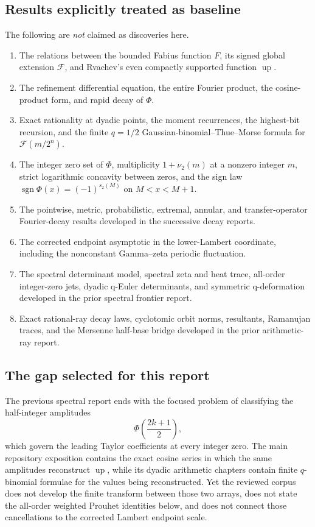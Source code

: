 \documentclass[11pt,oneside]{article}
\theoremstyle{definition}
\theoremstyle{remark}
\newcommand{\Up}{\operatorname{up}}
\newcommand{\GF}{\mathcal F}
\newcommand{\PhiU}{\Phi}
\begin{document}
\subsection{Results explicitly treated as baseline}

The following are \emph{not} claimed as discoveries here.
\begin{enumerate}
 \item The relations between the bounded Fabius function $F$, its signed global
 extension $\GF$, and Rvachev's even compactly supported function $\Up$.
 \item The refinement differential equation, the entire Fourier product, the
 cosine-product form, and rapid decay of $\PhiU$.
 \item Exact rationality at dyadic points, the moment recurrences, the
 highest-bit recursion, and the finite $q=1/2$ Gaussian-binomial--Thue--Morse
 formula for $\GF(m/2^n)$.
 \item The integer zero set of $\PhiU$, multiplicity $1+\nu_2(m)$ at a nonzero
 integer $m$, strict logarithmic concavity between zeros, and the sign law
 $\operatorname{sgn}\PhiU(x)=(-1)^{s_2(M)}$ on $M<x<M+1$.
 \item The pointwise, metric, probabilistic, extremal, annular, and transfer-operator
 Fourier-decay results developed in the successive decay reports.
 \item The corrected endpoint asymptotic in the lower-Lambert coordinate,
 including the nonconstant Gamma--zeta periodic fluctuation.
 \item The spectral determinant model, spectral zeta and heat trace, all-order
 integer-zero jets, dyadic q-Euler determinants, and symmetric q-deformation
 developed in the prior spectral frontier report.
 \item Exact rational-ray decay laws, cyclotomic orbit norms, resultants,
 Ramanujan traces, and the Mersenne half-base bridge developed in the prior
 arithmetic-ray report.
\end{enumerate}

\subsection{The gap selected for this report}

The previous spectral report ends with the focused problem of classifying the
half-integer amplitudes
\[
 \PhiU\!\left(\frac{2k+1}{2}\right),
\]
which govern the leading Taylor coefficients at every integer zero.  The main
repository exposition contains the exact cosine series in which the same
amplitudes reconstruct $\Up$, while its dyadic arithmetic chapters contain
finite $q$-binomial formulae for the values being reconstructed.  Yet the
reviewed corpus does not develop the finite transform between those two arrays,
does not state the all-order weighted Prouhet identities below, and does not
connect those cancellations to the corrected Lambert endpoint scale.
\end{document}
